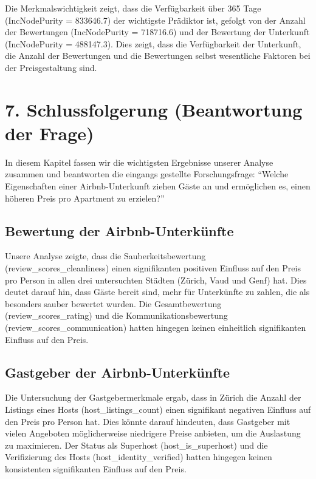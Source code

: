 \documentclass[
  journal,
]{IEEEtran}%
\begin{document}
Die Merkmalswichtigkeit zeigt, dass die Verfügbarkeit über 365 Tage
(IncNodePurity = 833646.7) der wichtigste Prädiktor ist, gefolgt von der
Anzahl der Bewertungen (IncNodePurity = 718716.6) und der Bewertung der
Unterkunft (IncNodePurity = 488147.3). Dies zeigt, dass die
Verfügbarkeit der Unterkunft, die Anzahl der Bewertungen und die
Bewertungen selbst wesentliche Faktoren bei der Preisgestaltung sind.

\section{7. Schlussfolgerung (Beantwortung der
Frage)}\label{schlussfolgerung-beantwortung-der-frage}

In diesem Kapitel fassen wir die wichtigsten Ergebnisse unserer Analyse
zusammen und beantworten die eingangs gestellte Forschungsfrage:
``Welche Eigenschaften einer Airbnb-Unterkunft ziehen Gäste an und
ermöglichen es, einen höheren Preis pro Apartment zu erzielen?''

\subsection{Bewertung der
Airbnb-Unterkünfte}\label{bewertung-der-airbnb-unterkuxfcnfte-1}

Unsere Analyse zeigte, dass die Sauberkeitsbewertung
(review\_scores\_cleanliness) einen signifikanten positiven Einfluss auf
den Preis pro Person in allen drei untersuchten Städten (Zürich, Vaud
und Genf) hat. Dies deutet darauf hin, dass Gäste bereit sind, mehr für
Unterkünfte zu zahlen, die als besonders sauber bewertet wurden. Die
Gesamtbewertung (review\_scores\_rating) und die Kommunikationsbewertung
(review\_scores\_communication) hatten hingegen keinen einheitlich
signifikanten Einfluss auf den Preis.

\subsection{Gastgeber der
Airbnb-Unterkünfte}\label{gastgeber-der-airbnb-unterkuxfcnfte}

Die Untersuchung der Gastgebermerkmale ergab, dass in Zürich die Anzahl
der Listings eines Hosts (host\_listings\_count) einen signifikant
negativen Einfluss auf den Preis pro Person hat. Dies könnte darauf
hindeuten, dass Gastgeber mit vielen Angeboten möglicherweise niedrigere
Preise anbieten, um die Auslastung zu maximieren. Der Status als
Superhost (host\_is\_superhost) und die Verifizierung des Hosts
(host\_identity\_verified) hatten hingegen keinen konsistenten
signifikanten Einfluss auf den Preis.
\end{document}
